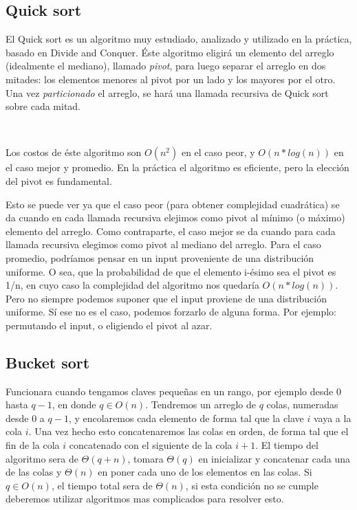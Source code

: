 \subsection{Quick sort}

El Quick sort es un algoritmo muy estudiado, analizado y utilizado en la pr\'actica, basado en Divide and Conquer.
\'Este algoritmo eligir\'a un elemento del arreglo (idealmente el mediano), llamado \textit{pivot}, para luego separar el arreglo en dos mitades: los elementos menores al pivot por un lado y los mayores por el otro. Una vez \textit{particionado} el arreglo, se har\'a una llamada recursiva de Quick sort sobre cada mitad.

~

Los costos de \'este algoritmo son $O(n^2)$ en el caso peor, y $O(n*log(n))$ en el caso mejor y promedio. En la pr\'actica el algoritmo es eficiente, pero la elecci\'on del pivot es fundamental.

Esto se puede ver ya que el caso peor (para obtener complejidad cuadr\'atica) se da cuando en cada llamada recursiva elejimos como pivot al m\'inimo (o m\'aximo) elemento del arreglo.
Como contraparte, el caso mejor se da cuando para cada llamada recursiva elegimos como pivot al mediano del arreglo.
Para el caso promedio, podr\'iamos pensar en un input proveniente de una distribuci\'on uniforme. O sea, que la probabilidad de que el elemento i-\'esimo sea el pivot es 1/n, en cuyo caso la complejidad del algoritmo nos quedar\'ia $O(n*log(n))$.
Pero no siempre podemos suponer que el input proviene de una distribuci\'on uniforme. S\'i ese no es el caso, podemos forzarlo de alguna forma. Por ejemplo: permutando el input, o eligiendo el pivot al azar.

\subsection{Bucket sort}

Funcionara cuando tengamos claves peque\~nas en un rango, por ejemplo desde $0$ hasta $q-1$, en donde $q \in O(n)$. Tendremos un arreglo de $q$ colas, numeradas desde $0$ a $q-1$, y encolaremos cada elemento de forma tal que la clave $i$ vaya a la cola $i$. Una vez hecho esto concatenaremos las colas en orden, de forma tal que el fin de la cola $i$ concatenado con el siguiente de la cola $i+1$. El tiempo del algoritmo sera de $\Theta(q+n)$, tomara $\Theta(q)$ en inicializar y concatenar cada una de las colas y $\Theta(n)$  en poner cada uno de los elementos en las colas. Si $q \in O(n)$, el tiempo total sera de $\Theta(n)$, si esta condici\'on no se cumple deberemos utilizar algoritmos mas complicados para resolver esto.

